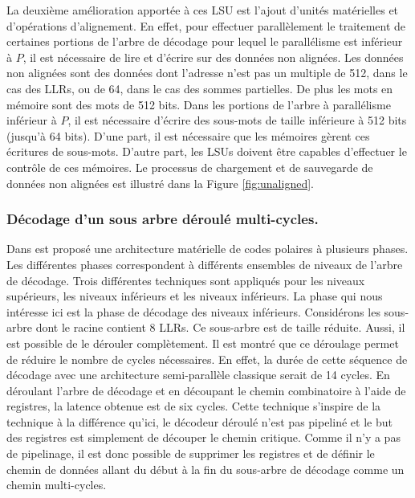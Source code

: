 La deuxième amélioration apportée à ces LSU est l'ajout d'unités matérielles et d'opérations d'alignement. En effet, pour effectuer parallèlement le traitement de certaines portions de l'arbre de décodage pour lequel le parallélisme est inférieur à $P$, il est nécessaire de lire et d'écrire sur des données non alignées. Les données non alignées sont des données dont l'adresse n'est pas un multiple de 512, dans le cas des LLRs, ou de 64, dans le cas des sommes partielles. De plus les mots en mémoire sont des mots de 512 bits. Dans les portions de l'arbre à parallélisme inférieur à $P$, il est nécessaire d'écrire des sous-mots de taille inférieure à 512 bits (jusqu'à 64 bits). D'une part, il est nécessaire que les mémoires gèrent ces écritures de sous-mots. D'autre part, les LSUs doivent être capables d'effectuer le contrôle de ces mémoires. Le processus de chargement et de sauvegarde de données non alignées est illustré dans la Figure \ref{fig:unaligned}.

\subsubsection{Décodage d'un sous arbre déroulé multi-cycles.}

Dans \cite{gal_scalable_2016} est proposé une architecture matérielle de codes polaires à plusieurs phases. Les différentes phases correspondent à différents ensembles de niveaux de l'arbre de décodage. Trois différentes techniques sont appliqués pour les niveaux supérieurs, les niveaux inférieurs et les niveaux inférieurs. La phase qui nous intéresse ici est la phase de décodage des niveaux inférieurs. Considérons les sous-arbre dont le \noeud racine contient 8 LLRs. Ce sous-arbre est de taille réduite. Aussi, il est possible de le dérouler complètement. Il est montré que ce déroulage permet de réduire le nombre de cycles nécessaires. En effet, la durée de cette séquence de décodage avec une architecture semi-parallèle classique serait de 14 cycles. En déroulant l'arbre de décodage et en découpant le chemin combinatoire à l'aide de registres, la latence obtenue est de six cycles. Cette technique s'inspire de la technique \cite{giard_unrolled_2015} à la différence qu'ici, le décodeur déroulé n'est pas pipeliné et le but des registres est simplement de découper le chemin critique. Comme il n'y a pas de pipelinage, il est donc possible de supprimer les registres et de définir le chemin de données allant du début à la fin du sous-arbre de décodage comme un chemin multi-cycles.

